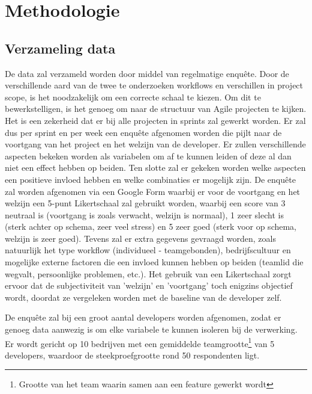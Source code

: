 \section{Methodologie}
\label{sec:methodologie}


\subsection{Verzameling data}
De data zal verzameld worden door middel van regelmatige enquête. Door de verschillende aard van de twee te onderzoeken workflows en verschillen in project scope, is het noodzakelijk om een correcte schaal te kiezen. Om dit te bewerkstelligen, is het genoeg om naar de structuur van Agile projecten te kijken. Het is een zekerheid dat er bij alle projecten in sprints zal gewerkt worden. Er zal dus per sprint en per week een enquête afgenomen worden die pijlt naar de voortgang van het project en het welzijn van de developer. Er zullen verschillende aspecten bekeken worden als variabelen om af te kunnen leiden of deze al dan niet een effect hebben op beiden. Ten slotte zal er gekeken worden welke aspecten een positieve invloed hebben en welke combinaties er mogelijk zijn.
De enquête zal worden afgenomen via een Google Form waarbij er voor de voortgang en het welzijn een 5-punt Likertschaal zal gebruikt worden, waarbij een score van 3 neutraal is (voortgang is zoals verwacht, welzijn is normaal), 1 zeer slecht is (sterk achter op schema, zeer veel stress) en 5 zeer goed (sterk voor op schema, welzijn is zeer goed). Tevens zal er extra gegevens gevraagd worden, zoals natuurlijk het type workflow (individueel - teamgebonden), bedrijfscultuur en mogelijke externe factoren die een invloed kunnen hebben op beiden (teamlid die wegvalt, persoonlijke problemen, etc.). Het gebruik van een Likertschaal zorgt ervoor dat de subjectiviteit van 'welzijn' en 'voortgang' toch enigzins objectief wordt, doordat ze vergeleken worden met de baseline van de developer zelf. 


De enquête zal bij een groot aantal developers worden afgenomen, zodat er genoeg data aanwezig is om elke variabele te kunnen isoleren bij de verwerking. Er wordt gericht op 10 bedrijven met een gemiddelde teamgrootte\footnote{Grootte van het team waarin samen aan een feature gewerkt wordt} van 5 developers, waardoor de steekproefgrootte rond 50 respondenten ligt.

